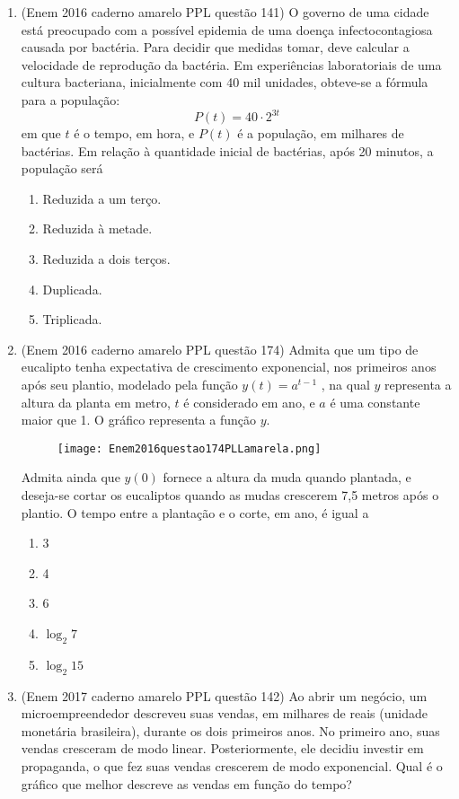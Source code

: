 \begin{enumerate}
	\item (Enem 2016 caderno amarelo PPL questão 141) O governo de uma cidade está preocupado com a possível epidemia de uma doença infectocontagiosa causada por bactéria. Para decidir que medidas tomar, deve calcular a velocidade de reprodução da bactéria. Em experiências laboratoriais de uma cultura bacteriana, inicialmente com 40 mil unidades, obteve-se a fórmula para a população:
	$$ P(t)=40\cdot 2^{3t} $$
	em que $ t $ é o tempo, em hora, e $ P(t) $ é a população, em milhares de bactérias. Em relação à quantidade inicial de bactérias, após 20 minutos, a população será
	\begin{enumerate}
		\item Reduzida a um terço.
		\item Reduzida à metade.
		\item Reduzida a dois terços.
		\item Duplicada.
		\item Triplicada.
	\end{enumerate}
	
	\clearpage

	\item (Enem 2016 caderno amarelo PPL questão 174) Admita que um tipo de eucalipto tenha expectativa de crescimento exponencial, nos primeiros anos após seu plantio, modelado pela função $ y(t)=a^{t-1} $ , na qual $ y $ representa a altura da planta em metro, $ t $ é considerado em ano, e $ a $ é uma constante maior que 1. O gráfico representa a função $ y $.
	\begin{figure}[H]
		\centering
		\texttt{[image: Enem2016questao174PLLamarela.png]}
		\caption{}
		\label{fig:enem2016questao174pllamarela}
	\end{figure}
	
	Admita ainda que $ y(0) $ fornece a altura da muda quando plantada, e deseja-se cortar os eucaliptos quando as mudas crescerem 7,5 metros após o plantio. O tempo entre a plantação e o corte, em ano, é igual a
	\begin{enumerate}
		\item 3
		\item 4
		\item 6
		\item $ \log_2 7 $
		\item $ \log_2 15 $
	\end{enumerate}
	
	\item (Enem 2017 caderno amarelo PPL questão 142) Ao abrir um negócio, um microempreendedor descreveu suas vendas, em milhares de reais (unidade monetária brasileira), durante os dois primeiros anos. No primeiro ano, suas vendas cresceram de modo linear. Posteriormente, ele decidiu investir em propaganda, o que fez suas vendas crescerem de modo exponencial.
	Qual é o gráfico que melhor descreve as vendas em função do tempo?


\end{enumerate}
